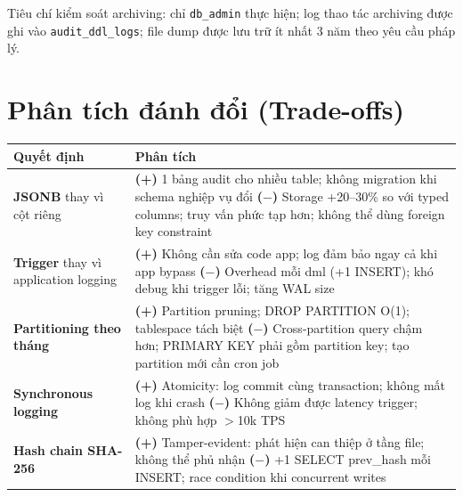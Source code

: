 Tiêu chí kiểm soát archiving: chỉ \texttt{db\_admin} thực hiện; log thao tác archiving được ghi vào \texttt{audit\_ddl\_logs}; file dump được lưu trữ ít nhất 3 năm theo yêu cầu pháp lý.

\section{Phân tích đánh đổi (Trade-offs)}

\begin{center}
\centering
{}
\label{tab:tradeoffs}
\renewcommand{\arraystretch}{1.4}
\begin{tabularx}{\textwidth}{>{\raggedright\arraybackslash}p{3.8cm}>{\raggedright\arraybackslash}X}
\toprule
\textbf{Quyết định} & \textbf{Phân tích} \\
\midrule
\textbf{JSONB} thay vì cột riêng &
  \textbf{(+)} 1 bảng audit cho nhiều table; không migration khi schema nghiệp vụ đổi \newline
  \textbf{($-$)} Storage +20--30\% so với typed columns; truy vấn phức tạp hơn; không thể dùng foreign key constraint \\
\textbf{Trigger} thay vì application logging &
  \textbf{(+)} Không cần sửa code app; log đảm bảo ngay cả khi app bypass \newline
  \textbf{($-$)} Overhead mỗi \ac{dml} (+1 INSERT); khó debug khi trigger lỗi; tăng WAL size \\
\textbf{Partitioning theo tháng} &
  \textbf{(+)} Partition pruning; DROP PARTITION O(1); tablespace tách biệt \newline
  \textbf{($-$)} Cross-partition query chậm hơn; PRIMARY KEY phải gồm partition key; tạo partition mới cần cron job \\
\textbf{Synchronous logging} &
  \textbf{(+)} Atomicity: log commit cùng transaction; không mất log khi crash \newline
  \textbf{($-$)} Không giảm được latency trigger; không phù hợp $>$10k TPS \\
\textbf{Hash chain SHA-256} &
  \textbf{(+)} Tamper-evident: phát hiện can thiệp ở tầng file; không thể phủ nhận \newline
  \textbf{($-$)} +1 SELECT prev\_hash mỗi INSERT; race condition khi concurrent writes \\
\bottomrule
\end{tabularx}
\renewcommand{\arraystretch}{1}
\end{center}

